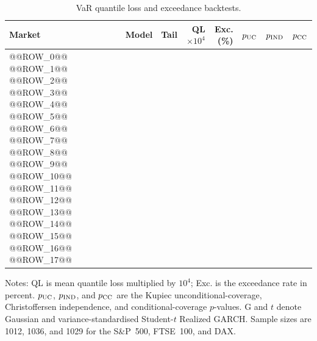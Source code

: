 \begin{table}[htbp]
\centering
\begin{threeparttable}
\caption{VaR quantile loss and exceedance backtests.}
\label{tab:var-backtests}
\scriptsize
\begin{tabular}{@{}lllrrrrr@{}}
\toprule
Market & Model & Tail & QL $\times10^4$ & Exc. (\%) & $p_{\rm UC}$ & $p_{\rm IND}$ & $p_{\rm CC}$ \\
\midrule
@@ROW_0@@
@@ROW_1@@
@@ROW_2@@
@@ROW_3@@
@@ROW_4@@
@@ROW_5@@
\addlinespace
@@ROW_6@@
@@ROW_7@@
@@ROW_8@@
@@ROW_9@@
@@ROW_10@@
@@ROW_11@@
\addlinespace
@@ROW_12@@
@@ROW_13@@
@@ROW_14@@
@@ROW_15@@
@@ROW_16@@
@@ROW_17@@
\bottomrule
\end{tabular}
\begin{tablenotes}[flushleft]
\footnotesize
\item Notes: QL is mean quantile loss multiplied by $10^4$; Exc. is the exceedance rate in percent. $p_{\rm UC}$, $p_{\rm IND}$, and $p_{\rm CC}$ are the Kupiec unconditional-coverage, Christoffersen independence, and conditional-coverage $p$-values. G and $t$ denote Gaussian and variance-standardised Student-$t$ Realized GARCH. Sample sizes are 1012, 1036, and 1029 for the S\&P~500, FTSE~100, and DAX.
\end{tablenotes}
\end{threeparttable}
\end{table}

